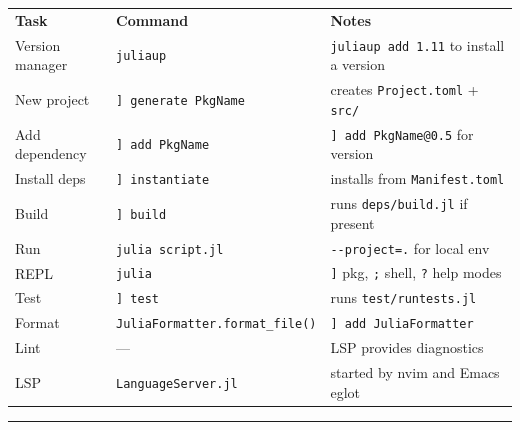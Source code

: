 \documentclass[10pt]{extarticle}
\begin{document}
\small


\begin{tabularx}{\linewidth}{@{}l@{\quad}l@{\quad}Y@{}}
\textbf{Task}        & \textbf{Command}                                  & \textbf{Notes} \\[2pt]
Version manager      & \texttt{juliaup}                                   & \texttt{juliaup add 1.11} to install a version \\
New project          & \texttt{] generate PkgName}                        & creates \texttt{Project.toml} + \texttt{src/} \\
Add dependency       & \texttt{] add PkgName}                             & \texttt{] add PkgName@0.5} for version \\
Install deps         & \texttt{] instantiate}                             & installs from \texttt{Manifest.toml} \\
Build                & \texttt{] build}                                   & runs \texttt{deps/build.jl} if present \\
Run                  & \texttt{julia script.jl}                           & \texttt{-{}-project=.} for local env \\
REPL                 & \texttt{julia}                                     & \texttt{]} pkg, \texttt{;} shell, \texttt{?} help modes \\
Test                 & \texttt{] test}                                    & runs \texttt{test/runtests.jl} \\
Format               & \texttt{JuliaFormatter.format\_file()}             & \texttt{] add JuliaFormatter} \\
Lint                 & ---                                                & LSP provides diagnostics \\
LSP                  & \texttt{LanguageServer.jl}                         & started by nvim and Emacs eglot \\
\end{tabularx}

\vspace{6pt}
\rule{\linewidth}{0.2pt}
\end{document}
